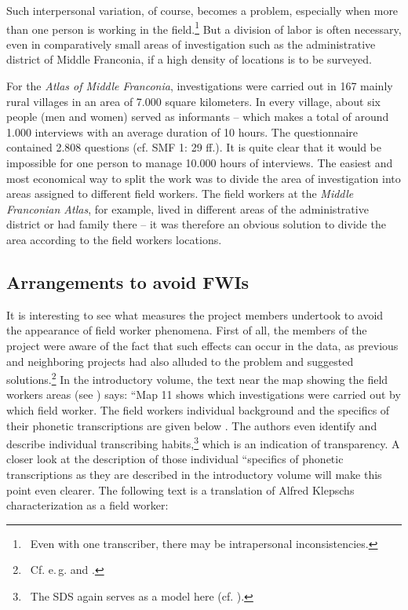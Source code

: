 \documentclass[output=paper]{LSP/langsci}
\begin{document}
Such interpersonal variation, of course, becomes a problem, especially when more than one person is working in the field.\footnote{\ Even with one transcriber, there may be intrapersonal inconsistencies.} But a division of labor is often necessary, even in comparatively small areas of investigation such as the administrative district of Middle Franconia, if a high density of locations is to be surveyed.

For the \textit{Atlas of Middle Franconia}, investigations were carried out in 167 mainly rural villages in an area of 7.000 square kilometers. In every village, about six people (men and women) served as informants – which makes a total of around 1.000 interviews with an average duration of 10 hours. The questionnaire contained 2.808 questions (cf. SMF 1: 29 ff.). It is quite clear that it would be impossible for one person to manage 10.000 hours of interviews. The easiest and most economical way to split the work was to divide the area of investigation into areas assigned to different field workers. The field workers at the \textit{Middle Franconian Atlas}, for example, lived in different areas of the administrative district or had family there – it was therefore an obvious solution to divide the area according to the field workers{\textquotesingle} locations.

\subsection{Arrangements to avoid FWIs}
It is interesting to see what measures the project members undertook to avoid the appearance of field worker phenomena. First of all, the members of the project were aware of the fact that such effects can occur in the data, as previous and neighboring projects had also alluded to the problem and suggested solutions.\footnote{\ Cf. e.\,g. \citet[59]{hotzenkocherle_einfuhrung_1962} and \citet[45]{konig_sprachatlas_1997}.} In the introductory volume, the text near the map showing the field workers{\textquotesingle} areas (see ) says: ``Map 11 shows which investigations were carried out by which field worker. The field workers{\textquotesingle} individual background and the specifics of their phonetic transcriptions are given below{\textquotedbl} \citep[47]{klepsch_sprachatlas_2013}. The authors even identify and describe individual transcribing habits,\footnote{\ The SDS again serves as a model here (cf. \citealt[61--73]{hotzenkocherle_einfuhrung_1962}).} which is an indication of transparency. A closer look at the description of those individual ``specifics of phonetic transcriptions{\textquotedbl} as they are described in the introductory volume will make this point even clearer. The following text is a translation of Alfred Klepsch{\textquotesingle}s characterization as a field worker:
\end{document}
